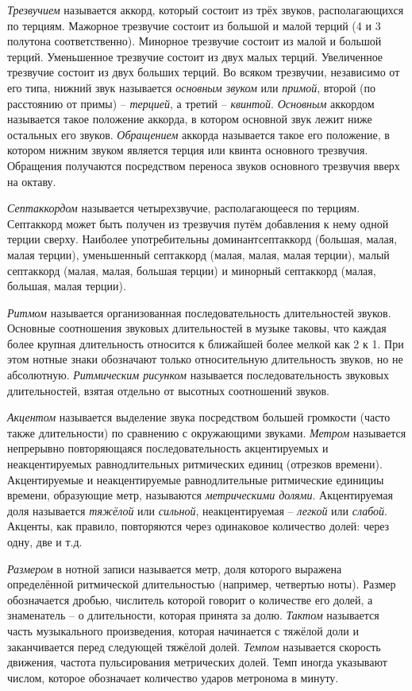 \emph{Трезвучием} называется аккорд, который состоит из трёх звуков,
располагающихся по терциям. Мажорное трезвучие состоит из большой и малой терций
(4 и 3 полутона соответственно). Минорное трезвучие состоит из малой и большой
терций. Уменьшенное трезвучие состоит из двух малых терций. Увеличенное
трезвучие состоит из двух больших терций. Во всяком трезвучии, независимо от его
типа, нижний звук называется \emph{основным звуком} или \emph{примой}, второй
(по расстоянию от примы) -- \emph{терцией}, а третий -- \emph{квинтой}.
\emph{Основным} аккордом называется такое положение аккорда, в котором основной
звук лежит ниже остальных его звуков. \emph{Обращением} аккорда называется такое
его положение, в котором нижним звуком является терция или квинта основного
трезвучия. Обращения получаются посредством переноса звуков основного трезвучия
вверх на октаву.

\emph{Септаккордом} называется четырехзвучие, располагающееся по терциям.
Септаккорд может быть получен из трезвучия путём добавления к нему одной терции
сверху. Наиболее употребительны доминантсептаккорд (большая, малая, малая
терции), уменьшенный септаккорд (малая, малая, малая терции), малый септаккорд
(малая, малая, большая терции) и минорный септаккорд (малая, большая, малая
терции).

\emph{Ритмом} называется организованная последовательность длительностей звуков.
Основные соотношения звуковых длительностей в музыке таковы, что каждая более
крупная длительность относится к ближайшей более мелкой как 2 к 1. При этом
нотные знаки обозначают только относительную длительность звуков, но не
абсолютную. \emph{Ритмическим рисунком} называется последовательность звуковых
длительностей, взятая отдельно от высотных соотношений звуков.

\emph{Акцентом} называется выделение звука посредством большей громкости (часто
также длительности) по сравнению с окружающими звуками. \emph{Метром} называется
непрерывно повторяющаяся последовательность акцентируемых и неакцентируемых
равнодлительных ритмических единиц (отрезков времени). Акцентируемые и
неакцентируемые равнодлительные ритмические единициы времени, образующие метр,
называются \emph{метрическими долями}. Акцентируемая доля называется
\emph{тяжёлой} или \emph{сильной}, неакцентируемая -- \emph{легкой} или
\emph{слабой}. Акценты, как правило, повторяются через одинаковое количество
долей: через одну, две и т.д.

\emph{Размером} в нотной записи называется метр, доля которого выражена
определённой ритмической длительностью (например, четвертью ноты). Размер
обозначается дробью, числитель которой говорит о количестве его долей, а
знаменатель -- о длительности, которая принята за долю. \emph{Тактом} называется
часть музыкального произведения, которая начинается с тяжёлой доли и
заканчивается перед следующей тяжёлой долей. \emph{Темпом} называется скорость
движения, частота пульсирования метрических долей. Темп иногда указывают числом,
которое обозначает количество ударов метронома в минуту.

